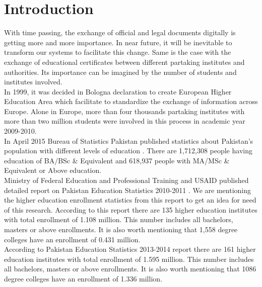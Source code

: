 \documentclass[12pt,a4paper,oneside]{book}
\begin{document}
\listoffigures
\listoftables

\resetpagenumbering

\chapter{Introduction}\label{ch-intro}

With time passing, the exchange of official and legal documents digitally is getting more and more importance. In near future, it will be inevitable to transform our systems to facilitate this change. Same is the case with the exchange of educational certificates between different partaking institutes and authorities. Its importance can be imagined by the number of students and institutes involved. \\

In 1999, it was decided in Bologna declaration to create European Higher Education Area which facilitate to standardize the exchange of information across Europe. Alone in Europe, more than four thousands partaking institutes with more than two million students were involved in this process in academic year 2009-2010. \\

In April 2015 Bureau of Statistics Pakistan published statistics about Pakistan's population with different levels of education \cite{Level of Edu}. There are 1,712,308 people having education of BA/BSc \& Equivalent and 618,937 people with MA/MSc \& Equivalent or Above education. \cite{Edu Stat} \\

Ministry of Federal Education and Professional Training and USAID published detailed report on Pakistan Education Statistics 2010-2011 \cite{Edu Stat}. We are mentioning the higher education enrollment statistics from this report to get an idea for need of this research. According to this report there are 135 higher education institutes with total enrollment of 1.108 million. This number includes all bachelors, masters or above enrollments. It is also worth mentioning that 1,558 degree colleges have an enrollment of 0.431 million. \\ 

According to Pakistan Education Statistics 2013-2014 report there are 161 higher education institutes with total enrollment of 1.595 million. This number includes all bachelors, masters or above enrollments. It is also worth mentioning that 1086 degree colleges have an enrollment of 1.336 million. \cite{Edu Stat2}\\
\end{document}
